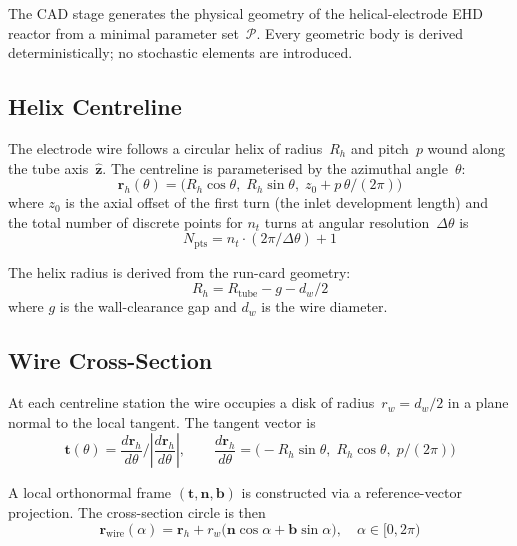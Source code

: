 \documentclass[11pt,a4paper]{article}
\begin{document}
The CAD stage generates the physical geometry of the helical-electrode EHD
reactor from a minimal parameter set~$\mathcal{P}$.  Every geometric body is
derived deterministically; no stochastic elements are introduced.

\subsection{Helix Centreline}

The electrode wire follows a circular helix of radius~$R_h$ and pitch~$p$
wound along the tube axis~$\hat{\bm{z}}$.  The centreline is parameterised by
the azimuthal angle~$\theta$:
\begin{equation}\label{eq:helix_centre}
  \bm{r}_h(\theta) = \bigl(R_h\cos\theta,\;
                            R_h\sin\theta,\;
                            z_0 + p\,\theta/(2\pi)\bigr)
\end{equation}
where $z_0$ is the axial offset of the first turn (the inlet development
length) and the total number of discrete points for $n_t$ turns at angular
resolution~$\Delta\theta$ is
\begin{equation}\label{eq:helix_npts}
  N_{\mathrm{pts}} = n_t \cdot (2\pi/\Delta\theta) + 1
\end{equation}

The helix radius is derived from the run-card geometry:
\begin{equation}\label{eq:helix_radius}
  R_h = R_{\mathrm{tube}} - g - d_w / 2
\end{equation}
where $g$ is the wall-clearance gap and $d_w$ is the wire diameter.

\subsection{Wire Cross-Section}

At each centreline station the wire occupies a disk of radius~$r_w = d_w/2$
in a plane normal to the local tangent.  The tangent vector is
\begin{equation}\label{eq:helix_tangent}
  \bm{t}(\theta) = \frac{d\bm{r}_h}{d\theta}\bigg/
                    \left|\frac{d\bm{r}_h}{d\theta}\right|
  ,\qquad
  \frac{d\bm{r}_h}{d\theta}
  = \bigl(-R_h\sin\theta,\; R_h\cos\theta,\; p/(2\pi)\bigr)
\end{equation}

A local orthonormal frame $(\bm{t}, \bm{n}, \bm{b})$ is constructed via a
reference-vector projection.  The cross-section circle is then
\begin{equation}\label{eq:wire_circle}
  \bm{r}_{\mathrm{wire}}(\alpha) = \bm{r}_h
    + r_w\bigl(\bm{n}\cos\alpha + \bm{b}\sin\alpha\bigr),
  \quad \alpha \in [0, 2\pi)
\end{equation}
\end{document}
